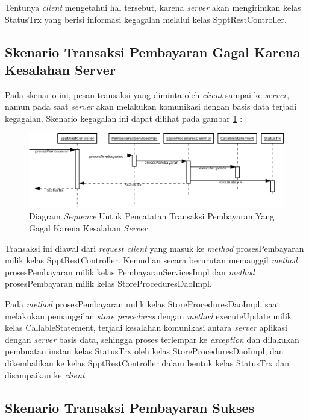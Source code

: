 Tentunya \textit{client} mengetahui hal tersebut, karena \textit{server} akan mengirimkan kelas StatusTrx yang berisi informasi kegagalan melalui kelas SpptRestController.

\subsection{Skenario Transaksi Pembayaran Gagal Karena Kesalahan Server}

Pada skenario ini, pesan transaksi yang diminta oleh \textit{client} sampai ke \textit{server}, namun pada saat \textit{server} akan melakukan komunikasi dengan basis data terjadi kegagalan. Skenario kegagalan ini dapat dilihat pada gambar \ref{fig:uml-seq-trx-db-error} :

\begin{figure}[H]
  \centering
  \includegraphics[width=1\textwidth]{./resources/uml/uml-seq-trx-db-error}
  \caption{Diagram \textit{Sequence} Untuk Pencatatan Transaksi Pembayaran Yang Gagal Karena Kesalahan \textit{Server}}
  \label{fig:uml-seq-trx-db-error}
\end{figure}

Transaksi ini diawal dari \textit{request client} yang masuk ke \textit{method} prosesPembayaran milik kelas SpptRestController. Kemudian secara berurutan memanggil \textit{method} prosesPembayaran milik kelas PembayaranServicesImpl dan \textit{method} prosesPembayaran milik kelas StoreProceduresDaoImpl.

Pada \textit{method} prosesPembayaran milik kelas StoreProceduresDaoImpl, saat melakukan pemanggilan \textit{store procedures} dengan \textit{method} executeUpdate milik kelas CallableStatement, terjadi kesalahan komunikasi antara \textit{server} aplikasi dengan \textit{server} basis data, sehingga proses terlempar ke \textit{exception} dan dilakukan pembuatan instan kelas StatusTrx oleh kelas StoreProceduresDaoImpl, dan dikembalikan ke kelas SpptRestController dalam bentuk kelas StatusTrx dan disampaikan ke \textit{client}.

\subsection{Skenario Transaksi Pembayaran Sukses}

